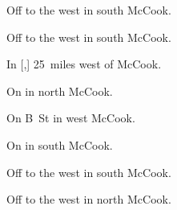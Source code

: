 
\begin{LocationList}

Off  to the west in south McCook.

Off  to the west in south McCook.

\Location{\GasStation \Gas \Rest}
In [,] 25~miles west of McCook.

On  in north McCook.

On   B~St in west McCook.

On  in south McCook.

Off  to the west in south McCook.

\Location{\TruckService \Service}
Off  to the west in north McCook.

\end{LocationList}
